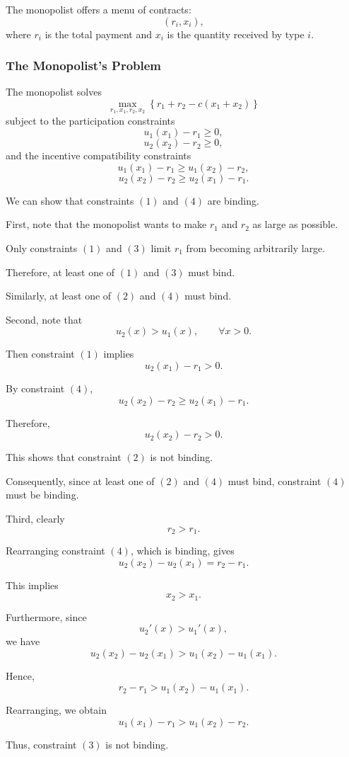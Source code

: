 The monopolist offers a menu of contracts:
\[
(r_i,x_i),
\]
where \(r_i\) is the total payment and \(x_i\) is the quantity received by type \(i\).

\subsubsection{The Monopolist's Problem}

The monopolist solves
\[
\max_{r_1,x_1,r_2,x_2}
\left\{
r_1+r_2-c(x_1+x_2)
\right\}
\]
subject to the participation constraints
\[
u_1(x_1)-r_1\ge 0,
\]
\[
u_2(x_2)-r_2\ge 0,
\]
and the incentive compatibility constraints
\[
u_1(x_1)-r_1
\ge
u_1(x_2)-r_2,
\]
\[
u_2(x_2)-r_2
\ge
u_2(x_1)-r_1.
\]

We can show that constraints \((1)\) and \((4)\) are binding.

First, note that the monopolist wants to make \(r_1\) and \(r_2\) as large as possible.

Only constraints \((1)\) and \((3)\) limit \(r_1\) from becoming arbitrarily large.

Therefore, at least one of \((1)\) and \((3)\) must bind.

Similarly, at least one of \((2)\) and \((4)\) must bind.




Second, note that
\[
u_2(x)>u_1(x),
\qquad
\forall x>0.
\]

Then constraint \((1)\) implies
\[
u_2(x_1)-r_1>0.
\]

By constraint \((4)\),
\[
u_2(x_2)-r_2
\ge
u_2(x_1)-r_1.
\]

Therefore,
\[
u_2(x_2)-r_2>0.
\]

This shows that constraint \((2)\) is not binding.

Consequently, since at least one of \((2)\) and \((4)\) must bind, constraint \((4)\) must be binding.

Third, clearly
\[
r_2>r_1.
\]

Rearranging constraint \((4)\), which is binding, gives
\[
u_2(x_2)-u_2(x_1)
=
r_2-r_1.
\]

This implies
\[
x_2>x_1.
\]

Furthermore, since
\[
u_2'(x)>u_1'(x),
\]
we have
\[
u_2(x_2)-u_2(x_1)
>
u_1(x_2)-u_1(x_1).
\]

Hence,
\[
r_2-r_1
>
u_1(x_2)-u_1(x_1).
\]

Rearranging, we obtain
\[
u_1(x_1)-r_1
>
u_1(x_2)-r_2.
\]

Thus, constraint \((3)\) is not binding.

